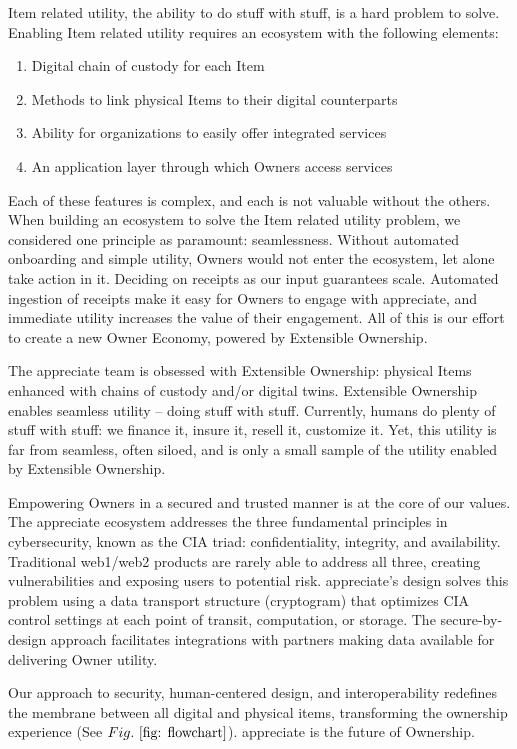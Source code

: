 \documentclass[a4paper,onecolumn, 10.5pt]{article}
\begin{document}
Item related utility, the ability to do stuff with stuff, is a hard problem to solve. Enabling Item related utility requires an ecosystem with the following elements:
\begin{enumerate}
	\item Digital chain of custody for each Item
	\item Methods to link physical Items to their digital counterparts
	\item Ability for organizations to easily offer integrated services
	\item An application layer through which Owners access services
\end{enumerate}

Each of these features is complex, and each is not valuable without the others. When building an ecosystem to solve the Item related utility problem, we considered one principle as paramount: seamlessness. Without automated onboarding and simple utility, Owners would not enter the ecosystem, let alone take action in it. Deciding on receipts as our input guarantees scale. Automated ingestion of receipts make it easy for Owners to engage with appreciate, and immediate utility increases the value of their engagement. All of this is our effort to create a new Owner Economy, powered by Extensible Ownership.

The appreciate team is obsessed with Extensible Ownership: physical Items enhanced with chains of custody and/or digital twins. Extensible Ownership enables seamless utility -- doing stuff with stuff. 
Currently, humans do plenty of stuff with stuff: we finance it, insure it, resell it, customize it. 
Yet, this utility is far from seamless, often siloed, and is only a small sample of the utility enabled by Extensible Ownership. 

Empowering Owners in a secured and trusted manner is at the core of our values. The appreciate ecosystem addresses the three fundamental principles in cybersecurity, known as the CIA triad: confidentiality, integrity, and availability. 
Traditional web1/web2 products are rarely able to address all three, creating vulnerabilities and exposing users to potential risk. 
appreciate’s design solves this problem using a data transport structure (cryptogram) that optimizes CIA control settings at each point of transit, computation, or storage. 
The secure-by-design approach facilitates integrations with partners making data available for delivering Owner utility. 

Our approach to security, human-centered design, and interoperability redefines the membrane between all digital and physical items, transforming the ownership experience (See \(Fig.~\ref{fig: flowchart}\)).
appreciate is the future of Ownership.  
\end{document}
